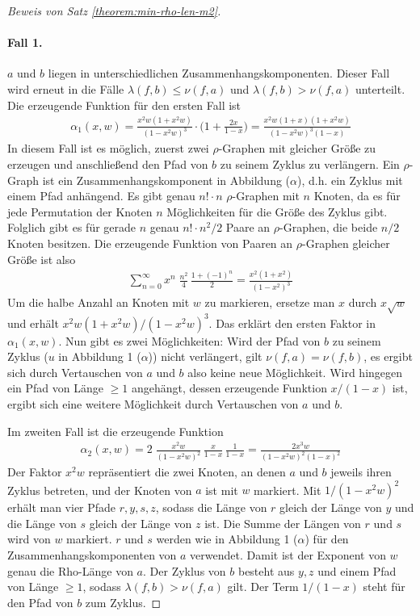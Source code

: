 \documentclass[a4paper, 10pt, ngerman]{article}
\begin{document}
\begin{proof}[Beweis von Satz \ref{theorem:min-rho-len-m2}]
    \paragraph{Fall 1.} $a$ und $b$ liegen in unterschiedlichen Zusammenhangskomponenten. Dieser Fall wird erneut in die Fälle $\lambda(f, b) \le \nu(f, a)$ und $\lambda(f, b) > \nu(f, a)$ unterteilt. Die erzeugende Funktion für den ersten Fall ist
    \begin{align*}
        \alpha_1(x, w) = \frac {x^2w(1 + x^2w)} {(1 - x^2w)^3} \cdot \Bigg (1 + \frac {2x} {1 - x} \Bigg ) = \frac {x^2w(1 + x)(1 + x^2w)} {(1 - x^2w)^3(1 - x)}
    \end{align*}
    In diesem Fall ist es möglich, zuerst zwei $\rho$-Graphen mit gleicher Größe zu erzeugen und anschließend den Pfad von $b$ zu seinem Zyklus zu verlängern. Ein $\rho$-Graph ist ein Zusammenhangskomponent in Abbildung ($\alpha$), d.h. ein Zyklus mit einem Pfad anhängend. Es gibt genau $n! \cdot n$ $\rho$-Graphen mit $n$ Knoten, da es für jede Permutation der Knoten $n$ Möglichkeiten für die Größe des Zyklus gibt. Folglich gibt es für gerade $n$ genau $n! \cdot n^2/2$ Paare an $\rho$-Graphen, die beide $n/2$ Knoten besitzen. Die erzeugende Funktion von Paaren an $\rho$-Graphen gleicher Größe ist also
    \begin{align*}
        \sum_{n = 0}^\infty x^n \; \frac {n^2} 4 \, \frac {1 + (-1)^n} 2
        = \frac {x^2(1 + x^2)} {(1 - x^2)^3}
    \end{align*}
    Um die halbe Anzahl an Knoten mit $w$ zu markieren, ersetze man $x$ durch $x \sqrt w$ und erhält $x^2w(1 + x^2w) / (1 - x^2w)^3$. Das erklärt den ersten Faktor in $\alpha_1(x, w)$. Nun gibt es zwei Möglichkeiten: Wird der Pfad von $b$ zu seinem Zyklus ($u$ in Abbildung 1 ($\alpha$)) nicht verlängert, gilt $\nu(f, a) = \nu(f, b)$, es ergibt sich durch Vertauschen von $a$ und $b$ also keine neue Möglichkeit. Wird hingegen ein Pfad von Länge $\ge 1$ angehängt, dessen erzeugende Funktion $x/(1 - x)$ ist, ergibt sich eine weitere Möglichkeit durch Vertauschen von $a$ und $b$.

    \noindent Im zweiten Fall ist die erzeugende Funktion
    \begin{align*}
        \alpha_2(x, w) =
        2 \; \frac {x^2w} {(1 - x^2w)^2} \, \frac x {1 - x} \,
        \frac {1}{1 - x}
        = \frac {2x^3w} {(1 - x^2w)^2 (1 - x)^2}
    \end{align*}
    Der Faktor $x^2w$ repräsentiert die zwei Knoten, an denen $a$ und $b$ jeweils ihren Zyklus betreten, und der Knoten von $a$ ist mit $w$ markiert. Mit $1 / (1 - x^2w)^2$ erhält man vier Pfade $r, y, s, z$, sodass die Länge von $r$ gleich der Länge von $y$ und die Länge von $s$ gleich der Länge von $z$ ist. Die Summe der Längen von $r$ und $s$ wird von $w$ markiert. $r$ und $s$ werden wie in Abbildung 1 ($\alpha$) für den Zusammenhangskomponenten von $a$ verwendet. Damit ist der Exponent von $w$ genau die Rho-Länge von $a$. Der Zyklus von $b$ besteht aus $y, z$ und einem Pfad von Länge $\ge 1$, sodass $\lambda(f, b) > \nu(f, a)$ gilt. Der Term $1 / (1 - x)$ steht für den Pfad von $b$ zum Zyklus.


\end{proof}
\end{document}
